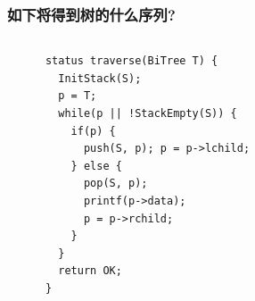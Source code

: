 \begin{frame}[fragile]
  \frametitle{如下将得到树的什么序列?}
  \begin{columns}[T]
    \begin{verbatim}
      status traverse(BiTree T) {
        InitStack(S);
        p = T;
        while(p || !StackEmpty(S)) {
          if(p) {
            push(S, p); p = p->lchild;
          } else {
            pop(S, p);
            printf(p->data);
            p = p->rchild;
          }
        }
        return OK;
      }
    \end{verbatim}

  \end{columns}  
\end{frame}

